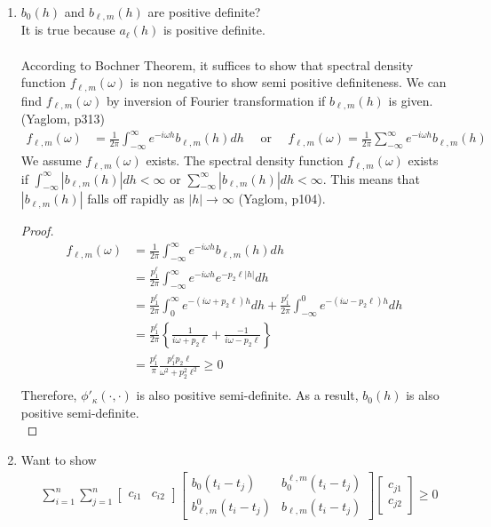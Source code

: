 \documentclass[11pt]{article}
\begin{document}
\begin{itemize}
\begin{enumerate}
\item
$b_{0}(h)$ and $b_{\ell,m}(h)$ are positive definite?\\ 
It is true because $a_\ell(h)$ is positive definite.\\
\\
According to Bochner Theorem, it suffices to show that spectral density function $f_{\ell,m}(\omega)$ is non negative to show semi positive definiteness. We can find $f_{\ell,m}(\omega)$ by inversion of Fourier transformation if $b_{\ell,m}(h)$ is given. (Yaglom, p313)\\
\begin{align*}
f_{\ell,m}(\omega) &=  \frac{1}{2\pi} \int_{-\infty}^\infty e^{-i\omega h} b_{\ell,m}(h) dh \quad \text{ or } \quad f_{\ell,m}(\omega) =  \frac{1}{2\pi} \sum_{-\infty}^\infty e^{-i\omega h} b_{\ell,m}(h) 
\end{align*}
We assume  $f_{\ell,m}(\omega)$ exists. The spectral density function $f_{\ell,m}(\omega)$ exists if $\int_{-\infty}^\infty |b_{\ell,m}(h)|dh < \infty$ or $\sum_{-\infty}^\infty |b_{\ell,m}(h)|dh < \infty$. This means that $|b_{\ell,m}(h)|$ falls off rapidly as $|h| \rightarrow \infty$ (Yaglom, p104).\\
\begin{proof}
\begin{align*}
f_{\ell,m}(\omega) &= \frac{1}{2\pi} \int_{-\infty}^\infty e^{-i\omega h} b_{\ell,m}(h) dh\\
&= \frac{p_1^\ell}{2\pi} \int_{-\infty}^\infty e^{-i\omega h} e^{-p_2 \ell |h|} dh\\
&= \frac{p_1^\ell}{2\pi} \int_{0}^\infty e^{-(i \omega + p_2 \ell) h} dh + \frac{p_1^\ell}{2\pi} \int_{-\infty}^0 e^{-(i \omega - p_2 \ell) h} dh\\
&= \frac{p_1^\ell}{2\pi} \left\{ \frac{1}{i \omega + p_2 \ell} + \frac{-1}{i \omega - p_2 \ell} \right\}\\
&= \frac{p_1^\ell}{\pi} \frac{p_1^\ell p_2 \ell}{\omega^2 + p_2^2 \ell^2} \ge 0\\
\end{align*}
Therefore, $\phi'_\kappa(\cdot,\cdot)$ is also positive semi-definite. As a result, $b_0(h)$ is also positive semi-definite.\\
\end{proof}

\item
Want to show\\
\begin{align*}
&\sum_{i=1}^n \sum_{j=1}^n 
\begin{bmatrix}
c_{i1} & c_{i2}
\end{bmatrix}
\begin{bmatrix}
b_0(t_i-t_j) & b_0^{\ell,m}(t_i-t_j)\\ 
b_{\ell,m}^0(t_i-t_j) & b_{\ell,m}(t_i-t_j)
\end{bmatrix}
\begin{bmatrix}
c_{j1}\\
c_{j2} 
\end{bmatrix}
\ge0
\end{align*}


\end{enumerate}
\end{itemize}
\end{document}
